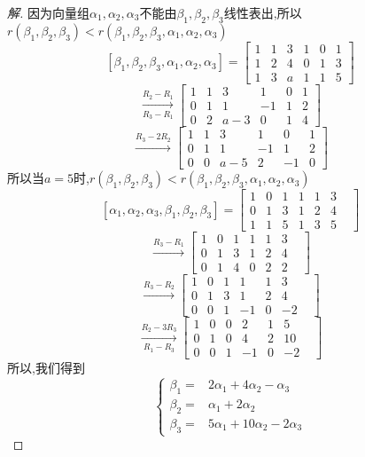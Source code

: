 \documentclass[10pt,a4paper]{report}
\begin{document}
\begin{proof}[解]
	因为向量组$\alpha_{1}, \alpha_{2}, \alpha_{3}$不能由$\beta_{1}, \beta_{2}, \beta_{3}$线性表出,所以$r(\beta_{1}, \beta_{2}, \beta_{3}) < r(\beta_{1}, \beta_{2}, \beta_{3}, \alpha_{1}, \alpha_{2}, \alpha_{3})$\\
	$$
	[\beta_{1}, \beta_{2}, \beta_{3}, \alpha_{1}, \alpha_{2}, \alpha_{3}] = \left[
	\begin{matrix}
	1 & 1 & 3 & 1 & 0 & 1\\
	1 & 2 & 4 & 0 & 1 & 3\\
	1 & 3 & a & 1 & 1 & 5
	\end{matrix}
	\right]
	$$
	$$
	\xrightarrow[R_{3}-R_{1}]{R_{2}-R_{1}}
	\left[
	\begin{matrix}
	1 & 1 & 3 & 1 & 0 & 1\\
	0 & 1 & 1 & -1 & 1 & 2\\
	0 & 2 & a-3 & 0 & 1 & 4
	\end{matrix}
	\right]
	$$
	$$
	\xrightarrow{R_{3}-2R_{2}}
	\left[
	\begin{matrix}
	1 & 1 & 3 & 1 & 0 & 1\\
	0 & 1 & 1 & -1 & 1 & 2\\
	0 & 0 & a-5 & 2 & -1 & 0
	\end{matrix}
	\right]
	$$
	所以当$a = 5$时,$r(\beta_{1}, \beta_{2}, \beta_{3}) < r(\beta_{1}, \beta_{2}, \beta_{3}, \alpha_{1}, \alpha_{2}, \alpha_{3})$
	$$
	[\alpha_{1}, \alpha_{2}, \alpha_{3}, \beta_{1}, \beta_{2}, \beta_{3}] = \left[
	\begin{matrix}
	1 & 0 & 1 & 1 & 1 & 3 \\
	0 & 1 & 3 & 1 & 2 & 4 \\
	1 & 1 & 5 & 1 & 3 & 5 &
	\end{matrix}
	\right]
	$$
	$$
	\xrightarrow{R_{3}-R_{1}} 
	\left[
	\begin{matrix}
	1 & 0 & 1 & 1 & 1 & 3 \\
	0 & 1 & 3 & 1 & 2 & 4 \\
	0 & 1 & 4 & 0 & 2 & 2 &
	\end{matrix}
	\right]
	$$
	$$
	\xrightarrow{R_{3}-R_{2}} 
	\left[
	\begin{matrix}
	1 & 0 & 1 & 1 & 1 & 3 \\
	0 & 1 & 3 & 1 & 2 & 4 \\
	0 & 0 & 1 & -1 & 0 & -2 &
	\end{matrix}
	\right]
	$$
	$$
	\xrightarrow[R_{1}-R_{3}]{R_{2}-3R_{3}} 
	\left[
	\begin{matrix}
	1 & 0 & 0 & 2 & 1 & 5 \\
	0 & 1 & 0 & 4 & 2 & 10 \\
	0 & 0 & 1 & -1 & 0 & -2 &
	\end{matrix}
	\right]
	$$
	所以,我们得到
	$$
	\left\{
	\begin{aligned}
	\beta_{1} = & 2\alpha_{1}+4\alpha_{2}-\alpha_{3} \\
	\beta_{2} = & \alpha_{1}+2\alpha_{2} \\
	\beta_{3} = & 5\alpha_{1}+10\alpha_{2}-2\alpha_{3} 
	\end{aligned}
	\right.
	$$
\end{proof}
\end{document}
